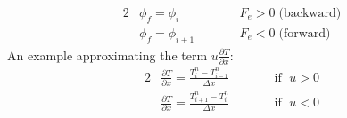 \begin{itemize}
\begin{itemize}
        \begin{alignat*}{2}
            & \phi_f = \phi_{i} \qquad && F_e > 0 \; \text{(backward)} \\
            & \phi_f = \phi_{i+1} \qquad && F_e < 0 \; \text{(forward)}
        \end{alignat*}
        An example approximating the term $u \frac{\partial T}{\partial x}$:
        \begin{alignat*}{2}
            & \frac{\partial T}{\partial x} = \frac{T_{i}^{n}-T_{i-1}^{n}}{\Delta x} \qquad && \text{if }\; u > 0 \\
            & \frac{\partial T}{\partial x} = \frac{T_{i+1}^{n}-T_{i}^{n}}{\Delta x} \qquad && \text{if }\; u < 0 
        \end{alignat*}
    \end{itemize}
\end{itemize}